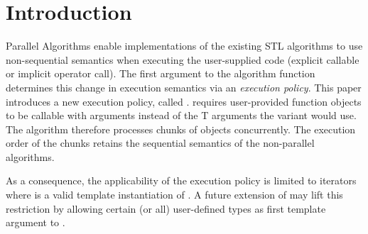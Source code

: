 \section{Introduction}

Parallel Algorithms enable implementations of the existing STL algorithms to use non-sequential semantics when executing the user-supplied code (explicit callable or implicit operator call).
The first argument to the algorithm function determines this change in execution semantics via an \emph{execution policy}.
This paper introduces a new execution policy, called \simdEP.
\simdEP requires user-provided function objects to be callable with \simd[<T, Abi>] arguments instead of the \type T arguments the \seqEP variant would use.
The algorithm therefore processes chunks of  objects concurrently.
The execution order of the chunks retains the sequential semantics of the non-parallel algorithms.

As a consequence, the applicability of the execution policy is limited to iterators where  is a valid template instantiation of \simd.
A future extension of \simd may lift this restriction by allowing certain (or all) user-defined types as first template argument to \simd.

